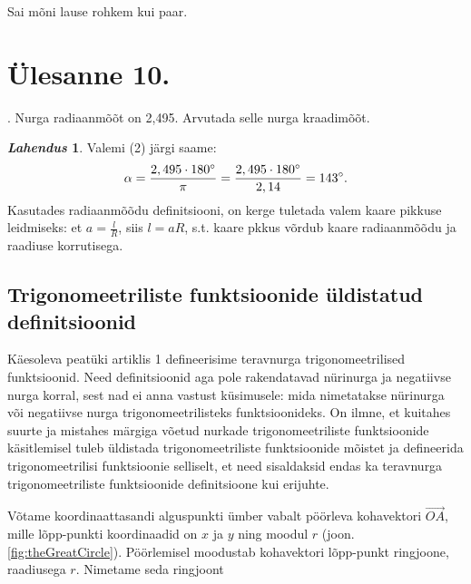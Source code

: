 \documentclass[a4paper,fleqn,12pt]{article}
\theoremstyle{definition}
\newtheorem*{solution}{\indent\textmd{\emph{Lahendus}}}
\begin{document}
Sai mõni lause rohkem kui paar.
\section{Ülesanne 10.}


\indent{}. Nurga radiaanmõõt on 2,495. Arvutada selle nurga kraadimõõt.
\begin{solution}
Valemi (2) järgi saame:
\begin{displaymath}
\alpha = \frac{2,495 \cdot 180 \degree}{\pi} = \frac{2,495 \cdot 180 \degree}{2,14} = 143 \degree.
\end{displaymath}
Kasutades radiaanmõõdu definitsiooni, on kerge tuletada valem kaare pikkuse leidmiseks: et $a=\frac{l}{R}$, siis $l=aR$, s.t. kaare pkkus võrdub kaare radiaanmõõdu ja raadiuse korrutisega.
\end{solution}

\subsection{Trigonomeetriliste funktsioonide üldistatud definitsioonid}

Käesoleva peatüki artiklis 1 defineerisime teravnurga trigonomeetrilised funktsioonid. Need definitsioonid aga pole rakendatavad nürinurga ja negatiivse nurga korral, sest nad ei anna vastust küsimusele: mida nimetatakse nürinurga või negatiivse nurga trigonomeetrilisteks funktsioonideks. On ilmne, et kuitahes suurte ja mistahes märgiga võetud nurkade trigonomeetriliste funktsioonide käsitlemisel tuleb üldistada trigonomeetriliste funktsioonide mõistet ja defineerida trigonomeetrilisi funktsioonie selliselt, et need sisaldaksid endas ka teravnurga trigonomeetriliste funktsioonide definitsioone kui erijuhte.

Võtame koordinaattasandi alguspunkti ümber vabalt pöörleva kohavektori $\overrightarrow{OA}$, mille lõpp-punkti koordinaadid on $x$ ja $y$ ning moodul $r$ (joon. \ref{fig:theGreatCircle}). Pöörlemisel moodustab kohavektori lõpp-punkt ringjoone, raadiusega $r$. Nimetame seda ringjoont
\end{document}
